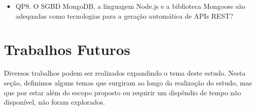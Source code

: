 \begin{itemize}
	\item QP8. O SGBD MongoDB, a linguagem Node.js e a biblioteca Mongoose são adequadas como tecnologias para a geração automática de APIs REST?
\end{itemize}




\section{Trabalhos Futuros}

Diversos trabalhos podem ser realizados expandindo o tema deste estudo. Nesta seção, definimos alguns temas que surgiram ao longo da realização do estudo, mas que por estar além do escopo proposto ou requirir um dispêndio de tempo não disponível, não foram explorados.

